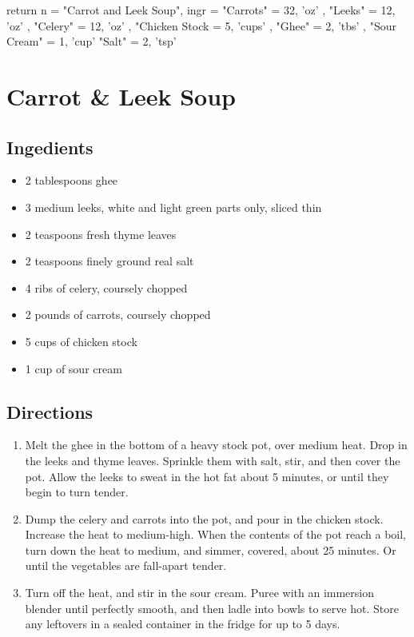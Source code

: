 return {
  n = "Carrot and Leek Soup",
  ingr = { 
    "Carrots" = { 32, 'oz' },
    "Leeks" = { 12, 'oz' }, 
    "Celery" = { 12, 'oz' },
    "Chicken Stock = { 5, 'cups' },
    "Ghee" = { 2, 'tbs' },
    "Sour Cream" = { 1, 'cup' }
    "Salt" = { 2, 'tsp' }
  }
}

\section{ Carrot \& Leek Soup }

\subsection{ Ingedients }

\begin{itemize}
  \item 2 tablespoons ghee
  \item 3 medium leeks, white and light green parts only, sliced thin 
  \item 2 teaspoons fresh thyme leaves
  \item 2 teaspoons finely ground real salt
  \item 4 ribs of celery, coursely chopped
  \item 2 pounds of carrots, coursely chopped
  \item 5 cups of chicken stock
  \item 1 cup of sour cream
\end{itemize}

\subsection{ Directions }

\begin{enumerate}
  \item Melt the ghee in the bottom of a heavy stock pot, over medium heat. Drop in the leeks and thyme leaves. Sprinkle them with salt, stir, and then cover the pot. Allow the leeks to sweat in the hot fat about 5 minutes, or until they begin to turn tender.
  \item Dump the celery and carrots into the pot, and pour in the chicken stock. Increase the heat to medium-high. When the contents of the pot reach a boil, turn down the heat to medium, and simmer, covered, about 25 minutes. Or until the vegetables are fall-apart tender. 
  \item Turn off the heat, and stir in the sour cream. Puree with an immersion blender until perfectly smooth, and then ladle into bowls to serve hot. Store any leftovers in a sealed container in the fridge for up to 5 days. 
\end{enumerate}

